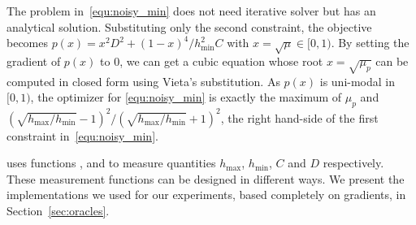 The problem in~\eqref{equ:noisy_min} does not need iterative solver but has an analytical solution. Substituting only the second constraint, the objective becomes $p(x)=x^2D^2 + (1-x)^4/h_{\min}^2C$ with $x=\sqrt{\mu} \in [0, 1)$. By setting the gradient of $p(x)$ to 0, we can get a cubic equation whose root $x=\sqrt{\mu_p}$ can be computed in closed form using Vieta's substitution. As $p(x)$ is uni-modal in $[0, 1)$, the optimizer for \eqref{equ:noisy_min} is exactly the maximum of $\mu_p$ and $(\sqrt{h_{\max}/h_{\min} }-1 )^2 / (\sqrt{h_{\max}/h_{\min}}+1)^2$, the right hand-side of the first constraint in~\eqref{equ:noisy_min}.

\tuner uses functions ,  and  to measure quantities $h_{\max}$, $h_{\min}$, $C$ and $D$ respectively. These measurement functions can be designed in different ways.
We present the implementations we used for our experiments,
based completely on gradients,  in Section~\ref{sec:oracles}.





